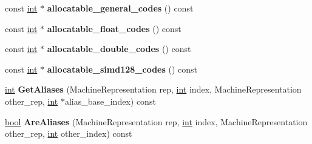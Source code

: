 \begin{DoxyCompactItemize}
const \mbox{\hyperlink{classint}{int}} $\ast$ {\bfseries allocatable\+\_\+general\+\_\+codes} () const
\item 
\mbox{\label{classv8_1_1internal_1_1RegisterConfiguration_ad07707af73184ae21c5ed2932292a6b9}} 
const \mbox{\hyperlink{classint}{int}} $\ast$ {\bfseries allocatable\+\_\+float\+\_\+codes} () const
\item 
\mbox{\label{classv8_1_1internal_1_1RegisterConfiguration_a1e65386b7f438470a5368bf976fd9f7c}} 
const \mbox{\hyperlink{classint}{int}} $\ast$ {\bfseries allocatable\+\_\+double\+\_\+codes} () const
\item 
\mbox{\label{classv8_1_1internal_1_1RegisterConfiguration_aa45e8bc2dcca1124002ae958ae2a09c5}} 
const \mbox{\hyperlink{classint}{int}} $\ast$ {\bfseries allocatable\+\_\+simd128\+\_\+codes} () const
\item 
\mbox{\label{classv8_1_1internal_1_1RegisterConfiguration_acd3660791638421dca93da0fde45f0aa}} 
\mbox{\hyperlink{classint}{int}} {\bfseries Get\+Aliases} (Machine\+Representation rep, \mbox{\hyperlink{classint}{int}} index, Machine\+Representation other\+\_\+rep, \mbox{\hyperlink{classint}{int}} $\ast$alias\+\_\+base\+\_\+index) const
\item 
\mbox{\label{classv8_1_1internal_1_1RegisterConfiguration_adbacb05e8f529c62412d2c8acc6bde13}} 
\mbox{\hyperlink{classbool}{bool}} {\bfseries Are\+Aliases} (Machine\+Representation rep, \mbox{\hyperlink{classint}{int}} index, Machine\+Representation other\+\_\+rep, \mbox{\hyperlink{classint}{int}} other\+\_\+index) const
\end{DoxyCompactItemize}
